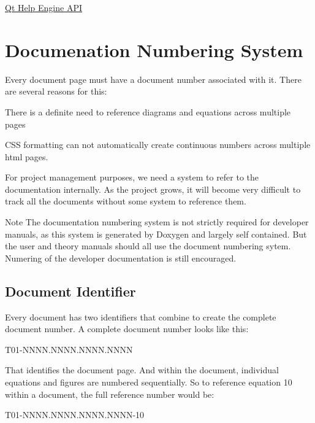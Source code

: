 \hyperlink{helpengine_api}{Qt Help Engine A\-P\-I} \hypertarget{docnumbersys}{}\section{Documenation Numbering System}\label{docnumbersys}
Every document page must have a document number associated with it. There are several reasons for this\-:
\begin{DoxyEnumerate}
\item There is a definite need to reference diagrams and equations across multiple pages
\end{DoxyEnumerate}
\begin{DoxyEnumerate}
\item C\-S\-S formatting can not automatically create continuous numbers across multiple html pages.
\end{DoxyEnumerate}
\begin{DoxyEnumerate}
\item For project management purposes, we need a system to refer to the documentation internally. As the project grows, it will become very difficult to track all the documents without some system to reference them.
\end{DoxyEnumerate}

\begin{DoxyNote}{Note}
The documentation numbering system is not strictly required for developer manuals, as this system is generated by Doxygen and largely self contained. But the user and theory manuals should all use the document numbering sytem. Numering of the developer documentation is still encouraged.
\end{DoxyNote}
\hypertarget{docnumbersys_docnumbersys_identifier}{}\subsection{Document Identifier}\label{docnumbersys_docnumbersys_identifier}
Every document has two identifiers that combine to create the complete document number. A complete document number looks like this\-: \begin{DoxyVerb}  T01-NNNN.NNNN.NNNN.NNNN
\end{DoxyVerb}


That identifies the document page. And within the document, individual equations and figures are numbered sequentially. So to reference equation 10 within a document, the full reference number would be\-: \begin{DoxyVerb}  T01-NNNN.NNNN.NNNN.NNNN-10
\end{DoxyVerb}


